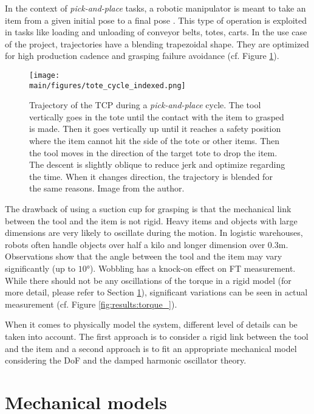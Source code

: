 \documentclass[/home/francois/latex/report/main.tex]{subfiles}
\begin{document}
In the context of \textit{pick-and-place} tasks, a robotic manipulator is meant to
take an item from a given initial pose to a final pose \cite{Angeles2006}. This type of operation is exploited in tasks like loading and unloading of conveyor belts, totes, carts. In the use case of the project, trajectories have a blending trapezoidal shape. They are optimized for high production cadence and grasping failure avoidance (cf. Figure \ref{fig:background:tote_cycle}).

\begin{figure}[H]
  \centering
  \texttt{[image: \\main/figures/tote\_cycle\_indexed.png]}
  \caption{Trajectory of the \ac{TCP} during a \textit{pick-and-place} cycle. The tool vertically goes in the tote until the contact with the item to grasped is made. Then it goes vertically up until it reaches a safety position where the item cannot hit the side of the tote or other items. Then the tool moves in the direction of the target tote to drop the item. The descent is slightly oblique to reduce jerk and optimize regarding the time. When it changes direction, the trajectory is blended for the same reasons. Image from the author.}
  \label{fig:background:tote_cycle}
\end{figure}

The drawback of using a suction cup for grasping is that the mechanical link between the tool and the item is not rigid. Heavy items and objects with large dimensions are very likely to oscillate during the motion. In logistic warehouses, robots often handle objects over half a kilo and longer dimension over $0.3 \si{\meter}$. Observations show that the angle between the tool and the item may vary significantly (up to $10 \si{\degree}$). Wobbling has a knock-on effect on \ac{FT} measurement. While there should not be any oscillations of the torque in a rigid model (for more detail, please refer to Section \ref{section:mechanical-models}), significant variations can be seen in actual measurement (cf. Figure \ref{fig:results:torque_}).

When it comes to physically model the system, different level of details can be taken into account. The first approach is to consider a rigid link between the tool and the item and a second approach is to fit an appropriate mechanical model considering the \ac{DoF} and the damped harmonic oscillator theory.

\section{Mechanical models}
\label{section:mechanical-models}
\end{document}
